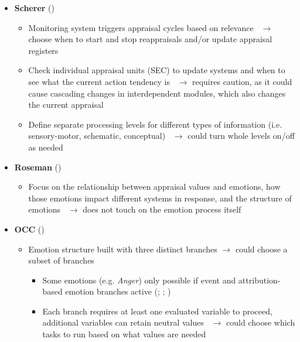 \begin{itemize}
    \item \textbf{Scherer} (\strong)
    \begin{itemize}
        \item Monitoring system triggers appraisal cycles based on
        relevance~\citep[p.~99]{scherer2001appraisalB} $\rightarrow$ choose
        when to start and stop reappraisals and/or update appraisal registers

        \item Check individual appraisal units (SEC) to update systems and when
        to see what the current action tendency is~\citep[p.~104,
        106]{scherer2001appraisalB} $\rightarrow$ requires caution, as it could
        cause cascading changes in interdependent modules, which also changes
        the current appraisal

        \item Define separate processing levels for different types of
        information (i.e. sensory-motor, schematic,
        conceptual)~\citep[p.~102--103]{scherer2001appraisalB} $\rightarrow$
        could turn whole levels on/off as needed
    \end{itemize}

    \item \textbf{Roseman} (\disqualified)
    \begin{itemize}
        \item Focus on the relationship between appraisal values and emotions,
        how those emotions impact different systems in response, and the
        structure of emotions~\citep[p.~68, 81]{roseman2001model} $\rightarrow$
        does not touch on the emotion process itself
    \end{itemize}

    \item \textbf{OCC} (\good)
    \begin{itemize}
        \item Emotion structure built with three distinct branches
        $\rightarrow$ could choose a subset of branches
        \begin{itemize}
            \item Some emotions (e.g. \textit{Anger}) only possible if event
            and attribution-based emotion branches active (;
            ; )

            \item Each branch requires at least one evaluated variable to
            proceed, additional variables can retain neutral
            values~\citep[p.~59, 81, 84]{occ} $\rightarrow$ could choose which
            tasks to run based on what values are needed


\end{itemize}
\end{itemize}
\end{itemize}
